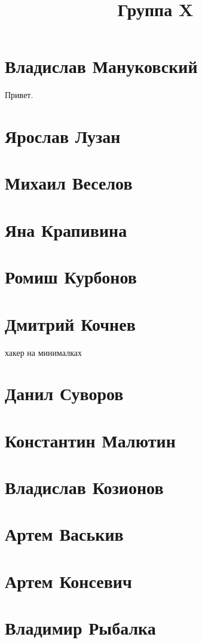 \documentclass{article}
\title{Группа X}
\begin{document}
\section*{Владислав Мануковский}
Привет.
\section*{Ярослав Лузан}

\section*{Михаил Веселов}

\section*{Яна Крапивина}

\section*{Ромиш Курбонов}

\section*{Дмитрий Кочнев}
хакер на минималках
\section*{Данил Суворов}

\section*{Константин Малютин}

\section*{Владислав Козионов}

\section*{Артем Васькив}

\section*{Артем Консевич}

\section*{Владимир Рыбалка}
\end{document}
